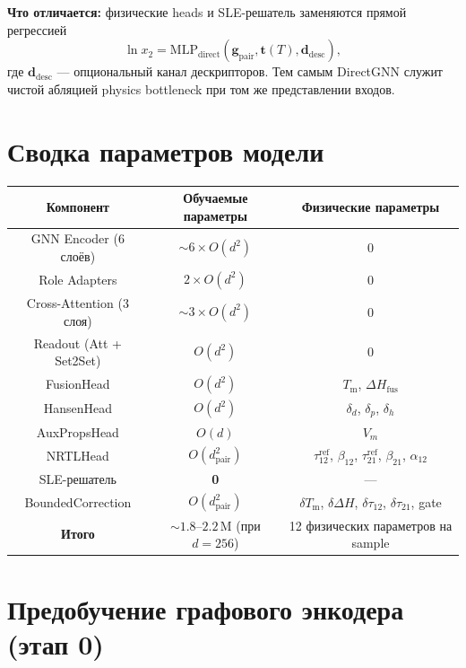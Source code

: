 \documentclass[11pt]{article}
\begin{document}
\textbf{Что отличается:} физические heads и SLE-решатель заменяются прямой регрессией
\begin{equation*}
\ln x_2 = \mathrm{MLP}_{\mathrm{direct}}(\mathbf{g}_{\mathrm{pair}},\mathbf{t}(T),\mathbf{d}_{\mathrm{desc}}),
\end{equation*}
где $\mathbf{d}_{\mathrm{desc}}$ --- опциональный канал дескрипторов. Тем самым DirectGNN служит чистой абляцией physics bottleneck при том же представлении входов.


\section{Сводка параметров модели}

\begin{center}
\begin{tabular}{|c|c|c|}
\hline
Компонент & Обучаемые параметры & Физические параметры \\
\hline
GNN Encoder (6 слоёв) & $\sim 6 \times O(d^2)$ & 0 \\
\hline
Role Adapters & $2 \times O(d^2)$ & 0 \\
\hline
Cross-Attention (3 слоя) & $\sim 3 \times O(d^2)$ & 0 \\
\hline
Readout (Att + Set2Set) & $O(d^2)$ & 0 \\
\hline
FusionHead & $O(d^2)$ & $T_{\mathrm{m}}$, $\Delta H_{\mathrm{fus}}$ \\
\hline
HansenHead & $O(d^2)$ & $\delta_d$, $\delta_p$, $\delta_h$ \\
\hline
AuxPropsHead & $O(d)$ & $V_m$ \\
\hline
NRTLHead & $O(d_{\mathrm{pair}}^2)$ & $\tau_{12}^{\mathrm{ref}}$, $\beta_{12}$, $\tau_{21}^{\mathrm{ref}}$, $\beta_{21}$, $\alpha_{12}$ \\
\hline
SLE-решатель & \textbf{0} & --- \\
\hline
BoundedCorrection & $O(d_{\mathrm{pair}}^2)$ & $\delta T_{\mathrm{m}}$, $\delta\Delta H$, $\delta\tau_{12}$, $\delta\tau_{21}$, gate \\
\hline
\textbf{Итого} & $\sim 1.8$--$2.2\,\mathrm{M}$ (при $d = 256$) & 12 физических параметров на sample \\
\hline
\end{tabular}
\end{center}

\section{Предобучение графового энкодера (этап 0)}
\label{sec:stage0-pretraining}
\end{document}
